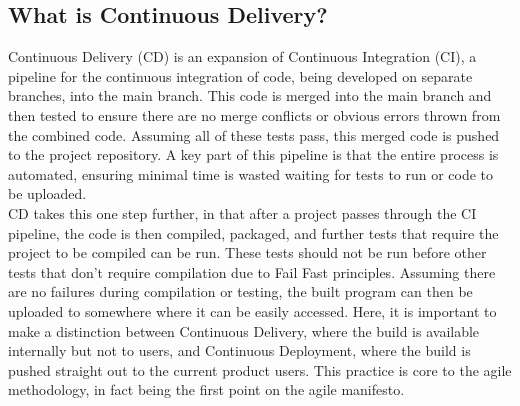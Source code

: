 \documentclass[lettersize,journal]{IEEEtran}
\begin{document}
    \subsection{What is Continuous Delivery?}
        Continuous Delivery (CD) is an expansion of Continuous Integration (CI), a pipeline for the continuous integration of code, being developed on separate branches, into the main branch. This code is merged into the main branch and then tested to ensure there are no merge conflicts or obvious errors thrown from the combined code. Assuming all of these tests pass, this merged code is pushed to the project repository. A key part of this pipeline is that the entire process is automated, ensuring minimal time is wasted waiting for tests to run or code to be uploaded.\cite{ContDelIntro,CICDCD} \\
        CD takes this one step further, in that after a project passes through the CI pipeline, the code is then compiled, packaged, and further tests that require the project to be compiled can be run. These tests should not be run before other tests that don't require compilation due to Fail Fast principles\cite{shore2004fail,bamboo}. Assuming there are no failures during compilation or testing, the built program can then be uploaded to somewhere where it can be easily accessed. Here, it is important to make a distinction between Continuous Delivery, where the build is available internally but not to users, and Continuous Deployment, where the build is pushed straight out to the current product users. This practice is core to the agile methodology, in fact being the first point on the agile manifesto\cite{agilemanifesto}.
\end{document}
